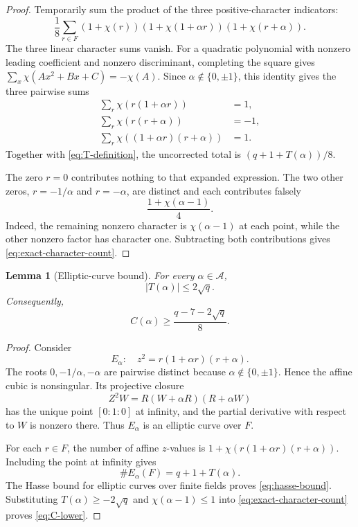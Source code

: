 \documentclass[11pt]{article}
\newtheorem{lemma}[theorem]{Lemma}
\theoremstyle{definition}
\theoremstyle{remark}
\newcommand{\calA}{\mathcal A}
\begin{document}
\begin{proof}
Temporarily sum the product of the three positive-character indicators:
\[
 \frac18\sum_{r\in F}
 (1+\chi(r))(1+\chi(1+\alpha r))(1+\chi(r+\alpha)).
\]
 The three linear character sums vanish.  For a quadratic polynomial with
 nonzero leading coefficient and nonzero discriminant, completing the square
 gives
 \(\sum_x\chi(Ax^2+Bx+C)=-\chi(A)\).  Since
 \(\alpha\notin\{0,\pm1\}\), this identity gives the three pairwise sums
\begin{align*}
 \sum_r\chi(r(1+\alpha r))&=1,\\
 \sum_r\chi(r(r+\alpha))&=-1,\\
 \sum_r\chi((1+\alpha r)(r+\alpha))&=1.
\end{align*}
Together with \eqref{eq:T-definition}, the uncorrected total is
\((q+1+T(\alpha))/8\).

The zero \(r=0\) contributes nothing to that expanded expression.  The two
other zeros, \(r=-1/\alpha\) and \(r=-\alpha\), are distinct and each
contributes falsely
\[
 \frac{1+\chi(\alpha-1)}{4}.
\]
Indeed, the remaining nonzero character is \(\chi(\alpha-1)\) at each
point, while the other nonzero factor has character one.
Subtracting both contributions gives
\eqref{eq:exact-character-count}.
\end{proof}

\begin{lemma}[Elliptic-curve bound]
\label{lem:hasse}
For every \(\alpha\in\calA\),
\begin{equation}
 |T(\alpha)|\leq2\sqrt q.
 \label{eq:hasse-bound}
\end{equation}
Consequently,
\begin{equation}
 C(\alpha)\geq\frac{q-7-2\sqrt q}{8}.
 \label{eq:C-lower}
\end{equation}
\end{lemma}

\begin{proof}
Consider
\begin{equation}
 E_\alpha:\quad z^2=r(1+\alpha r)(r+\alpha).
 \label{eq:elliptic-curve}
\end{equation}
The roots \(0,-1/\alpha,-\alpha\) are pairwise distinct because
\(\alpha\notin\{0,\pm1\}\).  Hence the affine cubic is nonsingular.  Its
projective closure
\[
 Z^2W=R(W+\alpha R)(R+\alpha W)
\]
has the unique point \([0:1:0]\) at infinity, and the partial derivative with
respect to \(W\) is nonzero there.  Thus \(E_\alpha\) is an elliptic curve
over \(F\).

For each \(r\in F\), the number of affine \(z\)-values is
\(1+\chi(r(1+\alpha r)(r+\alpha))\).  Including the point at infinity gives
\[
 \#E_\alpha(F)=q+1+T(\alpha).
\]
The Hasse bound for elliptic curves over finite fields
\cite[Chapter~V]{silverman} proves \eqref{eq:hasse-bound}.  Substituting
\(T(\alpha)\geq-2\sqrt q\) and \(\chi(\alpha-1)\leq1\) into
\eqref{eq:exact-character-count} proves \eqref{eq:C-lower}.
\end{proof}
\end{document}
